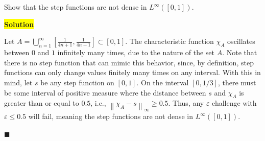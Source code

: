\documentclass[12pt]{article}
\newcommand\norm[1]{\left\lVert#1\right\rVert}
\newcommand{\mybox}{%
    \collectbox{%
        \setlength{\fboxsep}{2pt}%
        \fbox{\BOXCONTENT}%
    }%
}
\begin{document}
\noindent Show that the step functions are not dense in $L^{\infty}([0,1]).$

\vspace{5mm}

\noindent\mybox{\colorbox{yellow}{\textbf{Solution}}}\hspace{3mm}\hrulefill

\noindent Let $A = \bigcup\limits_{n=1}^{\infty}\left[\frac{1}{4n+1},\frac{1}{4n-1}\right]\subset [0,1].$ The characteristic function $\chi_A$ oscillates between $0$ and $1$ infinitely many times, due to the nature of the set $A$. Note that there is no step function that can mimic this behavior, since, by definition, step functions can only change values finitely many times on any interval. With this in mind, let $s$ be any step function on $[0,1]$. On the interval $[0,1/3]$, there must be some interval of positive measure where the distance between $s$ and $\chi_A$ is greater than or equal to $0.5$, i.e., $\norm{\chi_A - s}_{\infty}\geq 0.5$. Thus, any $\varepsilon$ challenge with $\varepsilon \leq 0.5$ will fail, meaning the step functions are not dense in $L^{\infty}([0,1]).$   

\hfill$\blacksquare$

\vfill

\begin{center}
\\
\vspace{2mm}
\vspace{-0.65cm}
\hrulefill \\
\vspace{-0.95cm}
\hrulefill
\end{center}
\end{document}
